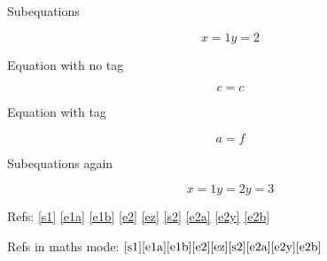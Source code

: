 \documentclass{article}
\begin{document}
Subequations

\begin{subequations}\label{s1}
\begin{equation}
x = 1 \label{e1a}
\end{equation}
\begin{equation}
y = 2\label{e1b}
\end{equation}
\end{subequations}

Equation with no tag

\begin{equation}\label{e2}
c = c
\end{equation}

Equation with tag

\begin{equation}\label{ez}
 a = f \tag{z}
\end{equation}

Subequations again

\begin{subequations}\label{s2}
\begin{equation}
x = 1\label{e2a}
\end{equation}
\begin{equation}
y = 2\tag{y}\label{e2y}
\end{equation}
\begin{equation}
y = 3\label{e2b}
\end{equation}
\end{subequations}

Refs: \ref{s1} \ref{e1a} \ref{e1b} \ref{e2} \ref{ez} \ref{s2} \ref{e2a} \ref{e2y} \ref{e2b}

Refs in maths mode: \( \ref{s1} \ref{e1a} \ref{e1b} \ref{e2} \ref{ez} \ref{s2} \ref{e2a} \ref{e2y} \ref{e2b} \)
\end{document}
